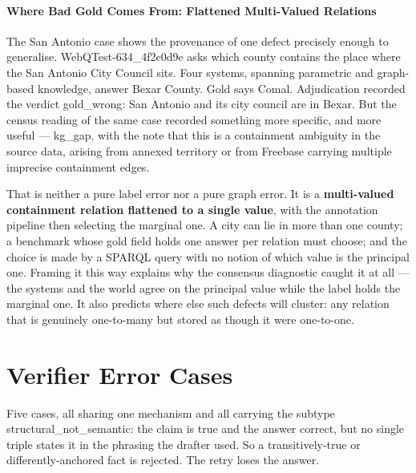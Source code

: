 \paragraph{Where Bad Gold Comes From: Flattened Multi-Valued
Relations}\label{sec:gold-provenance}

The San Antonio case shows the provenance of one defect precisely enough
to generalise. \textsf{WebQTest-634\_4f2c0d9e} asks which
county contains the place where the San Antonio City Council sits. Four systems,
spanning parametric and graph-based knowledge, answer Bexar County. Gold says
Comal. Adjudication recorded the verdict \textsf{gold\_wrong}: San Antonio and
its city council are in Bexar. But the census reading of the same case recorded
something more specific, and more useful --- \textsf{kg\_gap}, with the note
that this is a containment ambiguity in the source data, arising from annexed
territory or from Freebase carrying multiple imprecise containment edges.

That is neither a pure label error nor a pure graph error. It is a
\textbf{multi-valued containment relation flattened to a single value}, with the
annotation pipeline then selecting the marginal one. A city can lie in more than
one county; a benchmark whose gold field holds one answer per relation must
choose; and the choice is made by a SPARQL query with no notion of which value
is the principal one. Framing it this way explains why the consensus diagnostic
caught it at all --- the systems and the world agree on the principal value
while the label holds the marginal one. It also predicts where else such
defects will cluster: any relation that is genuinely one-to-many but stored as
though it were one-to-one.


\section{Verifier Error Cases}\label{app:verifier-cases}

Five cases, all sharing one mechanism and all carrying the subtype
\textsf{structural\_not\_semantic}: the claim is true and the answer correct,
but no single triple states it in the phrasing the drafter used. So a
transitively-true or differently-anchored fact is rejected. The retry loses
the answer.

